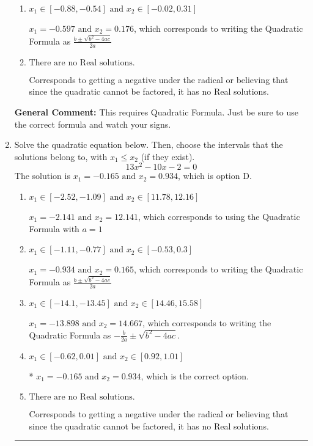 \documentclass{extbook}[14pt]
\newcommand{\litem}[1]{\item #1

\rule{\textwidth}{0.4pt}}
\begin{document}
\begin{enumerate}
{\begin{enumerate}[label=\Alph*.]
 $x_1 = -14.486 \text{ and } x_2 = 14.907$, which corresponds to writing the Quadratic Formula as $-\frac{b}{2a} \pm \sqrt{b^2 - 4ac}$.
\item \( x_1 \in [-0.88, -0.54] \text{ and } x_2 \in [-0.02, 0.31] \)

 $x_1 = -0.597 \text{ and } x_2 = 0.176$, which corresponds to writing the Quadratic Formula as $\frac{b \pm \sqrt{b^2 - 4ac}}{2a}$
\item \( \text{There are no Real solutions.} \)

Corresponds to getting a negative under the radical or believing that since the quadratic cannot be factored, it has no Real solutions.
\end{enumerate}

\textbf{General Comment:} This requires Quadratic Formula. Just be sure to use the correct formula and watch your signs.
}
\litem{
Solve the quadratic equation below. Then, choose the intervals that the solutions belong to, with $x_1 \leq x_2$ (if they exist).
\[ 13x^{2} -10 x -2 = 0 \]The solution is \( x_1 = -0.165 \text{ and } x_2 = 0.934 \), which is option D.\begin{enumerate}[label=\Alph*.]
\item \( x_1 \in [-2.52, -1.09] \text{ and } x_2 \in [11.78, 12.16] \)

 $x_1 = -2.141 \text{ and } x_2 = 12.141$, which corresponds to using the Quadratic Formula with $a=1$
\item \( x_1 \in [-1.11, -0.77] \text{ and } x_2 \in [-0.53, 0.3] \)

 $x_1 = -0.934 \text{ and } x_2 = 0.165$, which corresponds to writing the Quadratic Formula as $\frac{b \pm \sqrt{b^2 - 4ac}}{2a}$
\item \( x_1 \in [-14.1, -13.45] \text{ and } x_2 \in [14.46, 15.58] \)

 $x_1 = -13.898 \text{ and } x_2 = 14.667$, which corresponds to writing the Quadratic Formula as $-\frac{b}{2a} \pm \sqrt{b^2 - 4ac}$.
\item \( x_1 \in [-0.62, 0.01] \text{ and } x_2 \in [0.92, 1.01] \)

* $x_1 = -0.165 \text{ and } x_2 = 0.934$, which is the correct option.
\item \( \text{There are no Real solutions.} \)

Corresponds to getting a negative under the radical or believing that since the quadratic cannot be factored, it has no Real solutions.
\end{enumerate}

}
\end{enumerate}
\end{document}
